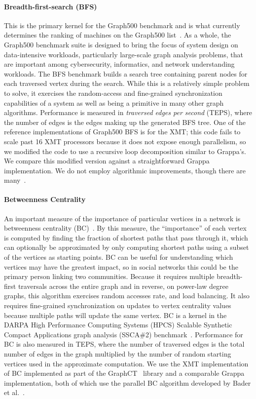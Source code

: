 \paragraph{Breadth-first-search (BFS)}
This is the primary kernel for the Graph500 benchmark and is what
currently determines the ranking of machines on the Graph500
list~\cite{graph500list}. As a whole, the Graph500 benchmark suite is
designed to bring the focus of system design on data-intensive
workloads, particularly large-scale graph analysis problems, that are
important among cybersecurity, informatics, and network understanding
workloads. The BFS benchmark builds a search tree containing parent
nodes for each traversed vertex during the search.  While this is a
relatively simple problem to solve, it exercises the random-access and
fine-grained synchronization capabilities of a system as well as being
a primitive in many other graph algorithms. Performance is measured in
\emph{traversed edges per second} (TEPS), where the number of edges is
the edges making up the generated BFS tree. One of the reference
implementations of Graph500 BFS is for the XMT; this code fails to
scale past 16 XMT processors because it does not expose enough
parallelism, so we modified the code to use a recursive loop
decomposition similar to Grappa's. We compare this modified version
against a straightforward Grappa implementation. We do not employ
algorithmic improvements, though there are
many~\cite{Beamer:Graph500,Yoo:FixedPointGraph500}.

\paragraph{Betweenness Centrality}
An important measure of the importance of particular vertices in a
network is betweenness centrality
(BC)~\cite{freeman1979centrality}. By this measure, the ``importance''
of each vertex is computed by finding the fraction of shortest paths
that pass through it, which can optionally be approximated by only
computing shortest paths using a subset of the vertices as starting
points. BC can be useful for understanding which vertices may have the
greatest impact, so in social networks this could be the primary
person linking two communities. Because it requires multiple
breadth-first traversals across the entire graph and in reverse, on
power-law degree graphs, this algorithm exercises random accesses
rate, and load balancing. It also requires fine-grained
synchronization on updates to vertex centrality values because
multiple paths will update the same vertex. BC is a kernel in the
DARPA High Performance Computing Systems (HPCS) Scalable Synthetic
Compact Applications graph analysis (SSCA\#2)
benchmark~\cite{ssca2}. Performance for BC is also measured in TEPS,
where the number of traversed edges is the total number of edges in
the graph multiplied by the number of random starting vertices used in
the approximate computation. We use the XMT implementation of BC
implemented as part of the GraphCT~\cite{GraphCT} library and a
comparable Grappa implementation, both of which use the parallel BC
algorithm developed by Bader et al.~\cite{bader:bc}.


